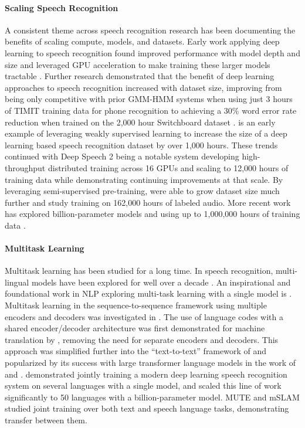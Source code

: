 \documentclass[nohyperref]{article}
\theoremstyle{plain}
\theoremstyle{definition}
\theoremstyle{remark}
\begin{document}
\paragraph{Scaling Speech Recognition} A consistent theme across speech recognition research has been documenting the benefits of scaling compute, models, and datasets. Early work applying deep learning to speech recognition found improved performance with model depth and size and leveraged GPU acceleration to make training these larger models tractable \cite{mohamed2009deep}. Further research demonstrated that the benefit of deep learning approaches to speech recognition increased with dataset size, improving from being only competitive with prior GMM-HMM systems when using just 3 hours of TIMIT training data for phone recognition to achieving a 30\% word error rate reduction when trained on the 2,000 hour Switchboard dataset \cite{seide2011feature}. \citet{liao2013large} is an early example of leveraging weakly supervised learning to increase the size of a deep learning based speech recognition dataset by over 1,000 hours. These trends continued with Deep Speech 2 \cite{amodei2015deepspeech2} being a notable system developing high-throughput distributed training across 16 GPUs and scaling to 12,000 hours of training data while demonstrating continuing improvements at that scale. By leveraging semi-supervised pre-training, \citet{narayanan2018toward} were able to grow dataset size much further and study training on 162,000 hours of labeled audio. More recent work has explored billion-parameter models \cite{zhang2020pushing} and using up to 1,000,000 hours of training data \cite{zhang2021bigssl}.

\paragraph{Multitask Learning} Multitask learning \cite{caruana1997multitask} has been studied for a long time. In speech recognition, multi-lingual models have been explored for well over a decade \cite{schultz2006multilingual}. An inspirational and foundational work in NLP exploring multi-task learning with a single model is \citet{collobert2011natural}. Multitask learning in the sequence-to-sequence framework \cite{sutskever2014sequence} using multiple encoders and decoders was investigated in \citet{luong2015multi}. The use of language codes with a shared encoder/decoder architecture was first demonstrated for machine translation by \citet{johnson2017google}, removing the need for separate encoders and decoders. This approach was simplified further into the ``text-to-text'' framework of \citet{mccann2018natural} and popularized by its success with large transformer language models in the work of \citet{radford2019gpt2} and \citet{raffel2020exploring}. \citet{Toshniwal2018MultilingualSR} demonstrated jointly training a modern deep learning speech recognition system on several languages with a single model, and \citet{Pratap2020MassivelyMA} scaled this line of work significantly to 50 languages with a billion-parameter model. MUTE \cite{wang2020multitask} and mSLAM \cite{bapna2022mslam} studied joint training over both text and speech language tasks, demonstrating transfer between them.
\end{document}
